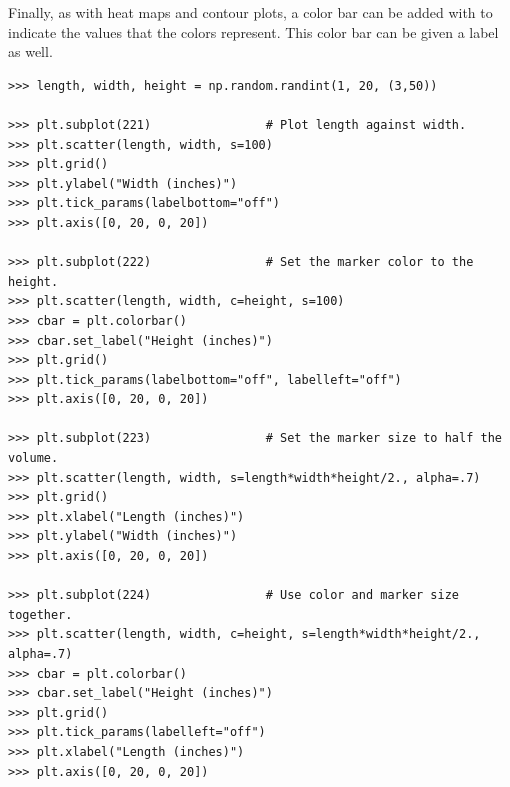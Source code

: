 Finally, as with heat maps and contour plots, a color bar can be added with  to indicate the values that the colors represent.
This color bar can be given a label as well.

\begin{lstlisting}
>>> length, width, height = np.random.randint(1, 20, (3,50))

>>> plt.subplot(221)                # Plot length against width.
>>> plt.scatter(length, width, s=100)
>>> plt.grid()
>>> plt.ylabel("Width (inches)")
>>> plt.tick_params(labelbottom="off")
>>> plt.axis([0, 20, 0, 20])

>>> plt.subplot(222)                # Set the marker color to the height.
>>> plt.scatter(length, width, c=height, s=100)
>>> cbar = plt.colorbar()
>>> cbar.set_label("Height (inches)")
>>> plt.grid()
>>> plt.tick_params(labelbottom="off", labelleft="off")
>>> plt.axis([0, 20, 0, 20])

>>> plt.subplot(223)                # Set the marker size to half the volume.
>>> plt.scatter(length, width, s=length*width*height/2., alpha=.7)
>>> plt.grid()
>>> plt.xlabel("Length (inches)")
>>> plt.ylabel("Width (inches)")
>>> plt.axis([0, 20, 0, 20])

>>> plt.subplot(224)                # Use color and marker size together.
>>> plt.scatter(length, width, c=height, s=length*width*height/2., alpha=.7)
>>> cbar = plt.colorbar()
>>> cbar.set_label("Height (inches)")
>>> plt.grid()
>>> plt.tick_params(labelleft="off")
>>> plt.xlabel("Length (inches)")
>>> plt.axis([0, 20, 0, 20])
\end{lstlisting}

